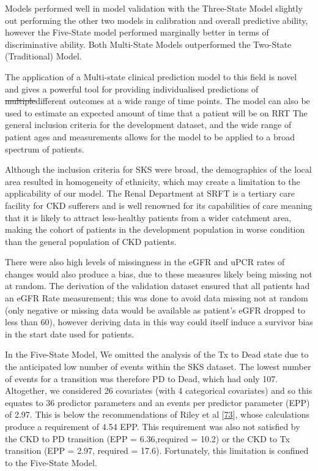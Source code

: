 \documentclass[
]{article}
\begin{document}
Models performed well in model validation with the Three-State Model slightly out performing the other two models in calibration and overall predictive ability, however the Five-State model performed marginally better in terms of discriminative ability. Both Multi-State Models outperformed the Two-State (Traditional) Model.

The application of a Multi-state clinical prediction model to this field is novel and gives a powerful tool for providing individualised predictions of \sout{multiple}different outcomes at a wide range of time points. The model can also be used to estimate an expected amount of time that a patient will be on RRT The general inclusion criteria for the development dataset, and the wide range of patient ages and measurements allows for the model to be applied to a broad spectrum of patients.

Although the inclusion criteria for SKS were broad, the demographics of the local area resulted in homogeneity of ethnicity, which may create a limitation to the applicability of our model. The Renal Department at SRFT is a tertiary care facility for CKD sufferers and is well renowned for its capabilities of care meaning that it is likely to attract less-healthy patients from a wider catchment area, making the cohort of patients in the development population in worse condition than the general population of CKD patients.

There were also high levels of missingness in the eGFR and uPCR rates of changes would also produce a bias, due to these measures likely being missing not at random. The derivation of the validation dataset ensured that all patients had an eGFR Rate measurement; this was done to avoid data missing not at random (only negative or missing data would be available as patient's eGFR dropped to less than 60), however deriving data in this way could itself induce a survivor bias in the start date used for patients.

In the Five-State Model, We omitted the analysis of the Tx to Dead state due to the anticipated low number of events within the SKS dataset. The lowest number of events for a transition was therefore PD to Dead, which had only 107. Altogether, we considered 26 covariates (with 4 categorical covariates) and so this equates to 36 predictor parameters and an events per predictor parameter (EPP) of 2.97. This is below the recommendations of Riley et al {[}\protect\hyperlink{ref-riley_minimum_2019}{73}{]}, whose calculations produce a requirement of 4.54 EPP. This requirement was also not satisfied by the CKD to PD transition (EPP = 6.36,required = 10.2) or the CKD to Tx transition (EPP = 2.97, required = 17.6). Fortunately, this limitation is confined to the Five-State Model.
\end{document}
